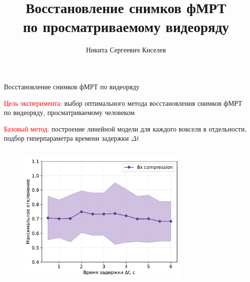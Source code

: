 \documentclass[10pt]{beamer}
\title[\hbox to 56mm{Восстановление снимков фМРТ}]{Восстановление снимков фМРТ \\ по просматриваемому видеоряду}
\author[Н.\,С.~Киселев]{Никита Сергеевич Киселев}
\institute{Московский физико-технический институт}
\date{\footnotesize
\par\smallskip\emph{Курс:} Автоматизация научных исследований\par/Группа 003
\par\smallskip\emph{Эксперт:} А.\,В.~Грабовой
\par\bigskip\small 2023}
\begin{document}
\begin{frame}{Восстановление снимков фМРТ по видеоряду}

\textcolor{red}{Цель эксперимента:} выбор оптимального метода восстановления снимков фМРТ по видеоряду,
просматриваемому человеком

\textcolor{red}{Базовый метод:} построение линейной модели для каждого вокселя в отдельности,
подбор гиперпараметра времени задержки $\Delta t$

\vspace{-0.5cm}

\begin{columns}[c]
        \begin{figure}[h!]
            \includegraphics[width=1.0\textwidth]{subs_deviation_dt.pdf}
        \end{figure}
        \begin{figure}[h!]
            \centering

\end{figure}
\end{columns}
\end{frame}
\end{document}
